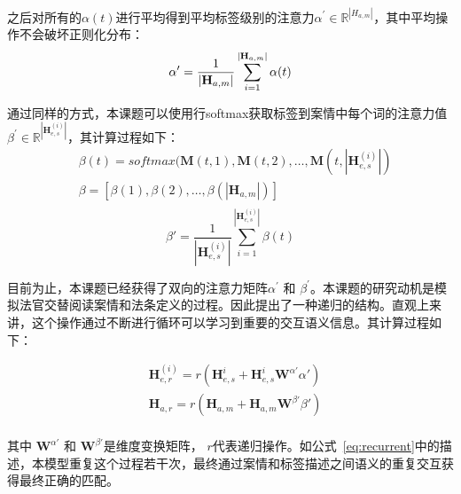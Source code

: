 之后对所有的$\alpha(t)$进行平均得到平均标签级别的注意力$\alpha^{'} \in \mathbb{R}^{|H_{a,m}|}$，其中平均操作不会破坏正则化分布：
\begin{equation}\label{eq:avg alpha}
    \alpha{'}=\frac{1}{|\textbf{H}_{a,m}|}\sum\limits_{i=1}^{|\textbf{H}_{a,m}|}\alpha(t) \\
\end{equation}

通过同样的方式，本课题可以使用行softmax获取标签到案情中每个词的注意力值$\beta^{'} \in \mathbb{R}^{|\textbf{H}_{e,s}^{(i)}|}$，其计算过程如下：
\begin{equation}
    \begin{aligned}
        & \beta(t)=softmax(\textbf{M}(t,1), \textbf{M}(t,2), \dots, \textbf{M}(t, |\textbf{H}_{e,s}^{(i)}|)\\
        & \beta = [\beta(1), \beta(2), \dots, \beta(|\textbf{H}_{a,m}|)] \\
    \end{aligned}
\end{equation}
\begin{equation}
    \beta{'}=\frac{1}{|\textbf{H}_{e,s}^{(i)}|}\sum\limits_{i=1}^{|\textbf{H}_{e,s}^{(i)}|}\beta(t)
\end{equation}

目前为止，本课题已经获得了双向的注意力矩阵$\alpha^{'}$ 和 $\beta^{'}$。本课题的研究动机是模拟法官交替阅读案情和法条定义的过程。因此提出了一种递归的结构。直观上来讲，这个操作通过不断进行循环可以学习到重要的交互语义信息。其计算过程如下：

\begin{equation}\label{eq:recurrent}
    \begin{aligned}
        & \textbf{H}_{e,r}^{(i)} = r(\textbf{H}_{e,s}^{i} + \textbf{H}_{e,s}^{i}\textbf{W}^{\alpha{'}}\alpha{'}) \\
        & \textbf{H}_{a,r} = r(\textbf{H}_{a,m} + \textbf{H}_{a,m}\textbf{W}^{\beta{'}}\beta{'}) \\
    \end{aligned}
\end{equation}

其中 $\textbf{W}^{\alpha{'}}$ 和 $\textbf{W}^{\beta{'}}$是维度变换矩阵， $r$代表递归操作。如公式~\ref{eq:recurrent}中的描述，本模型重复这个过程若干次，最终通过案情和标签描述之间语义的重复交互获得最终正确的匹配。


